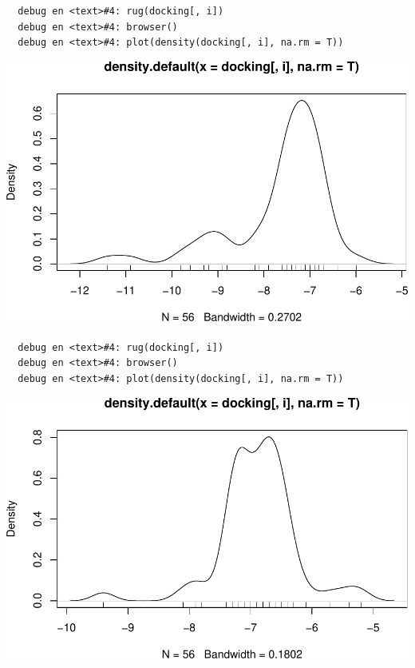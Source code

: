 \documentclass[12pt,twoside]{reedthesis}
\begin{document}
  \begin{verbatim}
  debug en <text>#4: rug(docking[, i])
  debug en <text>#4: browser()
  debug en <text>#4: plot(density(docking[, i], na.rm = T))
  \end{verbatim}
  
  \begin{center}\includegraphics{tesis_files/figure-latex/johan-3} \end{center}
  
  \begin{verbatim}
  debug en <text>#4: rug(docking[, i])
  debug en <text>#4: browser()
  debug en <text>#4: plot(density(docking[, i], na.rm = T))
  \end{verbatim}
  
  \begin{center}\includegraphics{tesis_files/figure-latex/johan-4} \end{center}
  
\end{document}
